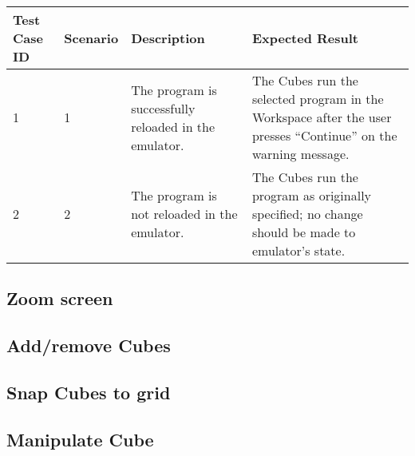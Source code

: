 \documentclass[12pt]{article}
\begin{document}
\begin{table}[h!]
  \begin{tabular}{p{.5in} | p{.75in} | p{2.15in} | p{2.15in}}
    \textbf{Test Case ID} &
    \textbf{Scenario} &
    \textbf{Description} &
    \textbf{Expected Result} \\ \hline

    1 &
    1 &
    The program is successfully reloaded in the emulator. &
    The Cubes run the selected program in the Workspace after the user presses ``Continue'' on the warning message. \\ \hline

    2 &
    2 &
    The program is not reloaded in the emulator. &
    The Cubes run the program as originally specified; no change should be made to emulator's state. \\ \hline

  \end{tabular}
\end{table}

\subsection{Zoom screen}


\subsection{Add/remove Cubes}


\subsection{Snap Cubes to grid}


\subsection{Manipulate Cube}
\end{document}
